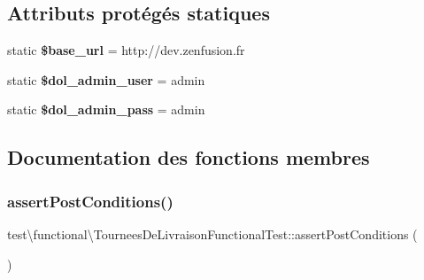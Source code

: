 \subsection*{Attributs protégés statiques}
\begin{DoxyCompactItemize}
\item 
\mbox{\label{classtest_1_1functional_1_1TourneesDeLivraisonFunctionalTest_ab7db0b87916bfd34e2a0fe2eaa417e46}} 
static {\bfseries \$base\+\_\+url} = \textquotesingle{}http\+://dev.\+zenfusion.\+fr\textquotesingle{}
\item 
\mbox{\label{classtest_1_1functional_1_1TourneesDeLivraisonFunctionalTest_aa91015d0633ea5dac8bf6de857fbdc52}} 
static {\bfseries \$dol\+\_\+admin\+\_\+user} = \textquotesingle{}admin\textquotesingle{}
\item 
\mbox{\label{classtest_1_1functional_1_1TourneesDeLivraisonFunctionalTest_aef2608e3c7cb3886c150aa00508ded2d}} 
static {\bfseries \$dol\+\_\+admin\+\_\+pass} = \textquotesingle{}admin\textquotesingle{}
\end{DoxyCompactItemize}


\subsection{Documentation des fonctions membres}
\mbox{\label{classtest_1_1functional_1_1TourneesDeLivraisonFunctionalTest_ad36c142208c9014f5296bcb9090eddc2}} 
\subsubsection{\texorpdfstring{assert\+Post\+Conditions()}{assertPostConditions()}}
{\footnotesize\ttfamily test\textbackslash{}functional\textbackslash{}\+Tournees\+De\+Livraison\+Functional\+Test\+::assert\+Post\+Conditions (\begin{DoxyParamCaption}{ }\end{DoxyParamCaption})\hspace{0.3cm}{\ttfamily [protected]}}

